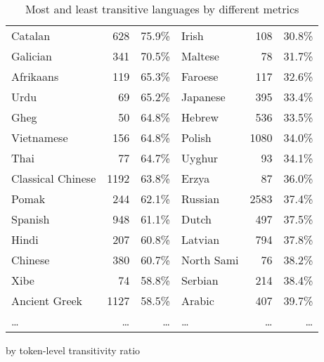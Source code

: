 \begin{table}[ht]
\begin{subtable}[c]{\textwidth}
\begin{tabular}{lrr|lrr}
        Catalan & 628 & 75.9\% & Irish & 108 & 30.8\% \\
        Galician & 341 & 70.5\% & Maltese & 78 & 31.7\% \\
        Afrikaans & 119 & 65.3\% & Faroese & 117 & 32.6\% \\
        Urdu & 69 & 65.2\% & Japanese & 395 & 33.4\% \\
        Gheg & 50 & 64.8\% & Hebrew & 536 & 33.5\% \\
        Vietnamese & 156 & 64.8\% & Polish & 1080 & 34.0\% \\
        Thai & 77 & 64.7\% & Uyghur & 93 & 34.1\% \\
        Classical Chinese & 1192 & 63.8\% & Erzya & 87 & 36.0\% \\
        Pomak & 244 & 62.1\% & Russian & 2583 & 37.4\% \\
        Spanish & 948 & 61.1\% & Dutch & 497 & 37.5\% \\
        Hindi & 207 & 60.8\% & Latvian & 794 & 37.8\% \\
        Chinese & 380 & 60.7\% & North Sami & 76 & 38.2\% \\
        Xibe & 74 & 58.8\% & Serbian & 214 & 38.4\% \\
        Ancient Greek & 1127 & 58.5\% & Arabic & 407 & 39.7\% \\
        \dots & \dots & \dots & \dots & \dots & \dots \\
        \bottomrule
      \end{tabular}
      \caption{by token-level transitivity ratio}
      \label{tab:most_tr_by_token_mean}
    \end{subtable}
    \caption{Most and least transitive languages by different metrics}
    \label{tab:most_tr_languages}
  \end{table}